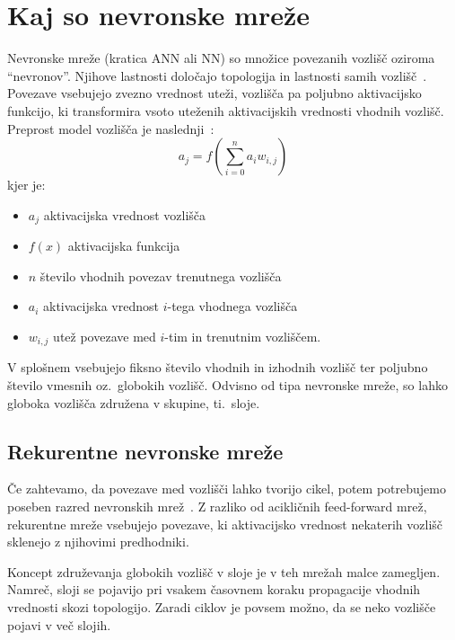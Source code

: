 \documentclass[a4paper,12pt,openright]{book}
\begin{document}
    \section{Kaj so nevronske mreže}\label{sec:kaj-so-nevronske-mreze}
    Nevronske mreže (kratica ANN ali NN) so množice povezanih vozlišč oziroma ``nevronov''.
    Njihove lastnosti določajo topologija in lastnosti samih vozlišč~\cite{russell_norvig_2016}.
    Povezave vsebujejo zvezno vrednost uteži, vozlišča pa poljubno aktivacijsko funkcijo, ki transformira vsoto uteženih
    aktivacijskih vrednosti vhodnih vozlišč.
    Preprost model vozlišča je naslednji~\cite{russell_norvig_2016}:
    \begin{equation}
        a_j=f(\sum_{i=0}^{n} a_i w_{i,j})
        \label{eq:neuron_model_splosno}
    \end{equation}
    kjer je:
    \begin{itemize}
        \item $a_j$ aktivacijska vrednost vozlišča
        \item $f(x)$ aktivacijska funkcija
        \item $n$ število vhodnih povezav trenutnega vozlišča
        \item $a_i$ aktivacijska vrednost $i$-tega vhodnega vozlišča
        \item $w_{i,j}$ utež povezave med $i$-tim in trenutnim vozliščem.
    \end{itemize}

    V splošnem vsebujejo fiksno število vhodnih in izhodnih vozlišč ter poljubno število vmesnih oz.\ globokih vozlišč.
    Odvisno od tipa nevronske mreže, so lahko globoka vozlišča združena v skupine, ti.\ sloje.

    \subsection{Rekurentne nevronske mreže}\label{subsec:rekurentne-nevronske-mreze}
    Če zahtevamo, da povezave med vozlišči lahko tvorijo cikel, potem potrebujemo poseben razred nevronskih mrež~\cite{recurrent_neural_network_wiki}.
    Z razliko od acikličnih feed-forward mrež, rekurentne mreže vsebujejo povezave, ki aktivacijsko vrednost nekaterih vozlišč
    sklenejo z njihovimi predhodniki.

    Koncept združevanja globokih vozlišč v sloje je v teh mrežah malce zamegljen.
    Namreč, sloji se pojavijo pri vsakem časovnem koraku propagacije vhodnih vrednosti skozi topologijo.
    Zaradi ciklov je povsem možno, da se neko vozlišče pojavi v več slojih.
\end{document}
